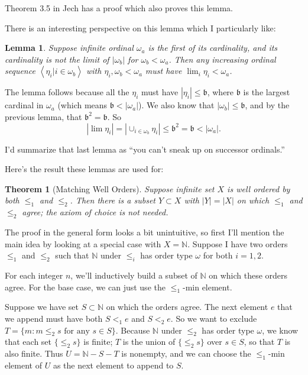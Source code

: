 \documentclass[11pt]{amsart}
\newtheorem{Lemma}[Def]{Lemma}
\newtheorem{Thm}[Def]{Theorem}
\newcommand\N{\mathbb N}
\begin{document}
Theorem 3.5 in Jech has a proof which also proves this lemma.

There is an interesting perspective on this lemma which I particularly like:

\begin{Lemma}
Suppose infinite ordinal $\omega_a$ is the first  of its cardinality, and its
cardinality is not the limit of $|\omega_b|$ for $\omega_b < \omega_a$.
Then any increasing ordinal sequence $\left< \eta_i | i \in \omega_b \right>$
with $\eta_i, \omega_b < \omega_a$ must have $\lim_i \eta_i < \omega_a$.
\end{Lemma}

The lemma follows because all the $\eta_i$ must have $|\eta_i| \le \mathfrak b$,
where $\mathfrak b$ is the largest cardinal in $\omega_a$ (which means
$\mathfrak b < |\omega_a|$).
We also know that $|\omega_b| \le \mathfrak b$,
and by the previous lemma, that $\mathfrak b^2 = \mathfrak b$. So
$$ | \lim \eta_i | = | \cup_{i\in\omega_b} \eta_i | \le \mathfrak b^2 = \mathfrak b < |\omega_a|.$$

I'd summarize that last lemma as ``you can't sneak up on successor ordinals.''

Here's the result these lemmas are used for:

\begin{Thm}[Matching Well Orders]
Suppose infinite set $X$ is well ordered by both $\le_1$ and $\le_2$.
Then there is a subset $Y \subset X$ with $|Y| = |X|$ on which
$\le_1$ and $\le_2$ agree; the axiom of choice is not needed.
\end{Thm}

The proof in the general form looks a bit unintuitive, so first I'll mention the
main idea by looking at a special case with $X=\N$.
Suppose I have two orders $\le_1$ and $\le_2$ such that
$\N$ under $\le_i$ has order type $\omega$ for both $i=1,2$.

For each integer $n$, we'll inductively build a subset of $\N$ on which
these orders agree. For the base case, we can just use the $\le_1$-min
element.

Suppose we have set $S\subset\N$ on which the orders agree.
The next element $e$ that we append must have both $S <_1 e$ and $S <_2 e$.
So we want to exclude $T = \{ m : m \le_2 s \text{ for any } s \in S\}$.
Because $\N$ under $\le_2$ has order type $\omega$, we know that each
set $\{ \le_2 s \}$ is finite; $T$ is the union of $\{ \le_2 s\}$ over $s\in S$, so that
$T$ is also finite. Thus $U = \N - S - T$ is nonempty, and we can choose the
$\le_1$-min element of $U$ as the next element to append to $S$.
\end{document}
